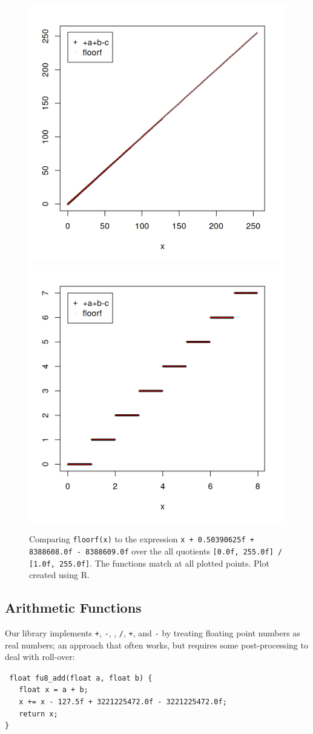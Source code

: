 \documentclass{acmsiggraph}
\theoremstyle{remark}
\theoremstyle{definition}
\begin{document}
\begin{figure}[tb!]
\begin{center}
\includegraphics[width=0.49\columnwidth]{floor256.png}
\includegraphics[width=0.49\columnwidth]{floor8.png}
\end{center}
\caption{\label{fig-floor-graph} Comparing {\tt floorf(x)} to the expression {\tt x + 0.50390625f + 8388608.0f - 8388609.0f} over the all quotients {\tt [0.0f, 255.0f] / [1.0f, 255.0f]}.
The functions match at all plotted points.
{\small Plot created using R.}}
\end{figure}


\subsection{Arithmetic Functions}
Our library implements {\tt +}, {\tt -}, {\tt *}, {\tt /}, {\tt +}, and {\tt -} by treating floating point numbers as real numbers; an approach that often works, but requires some post-processing to deal with roll-over:

{\tt
float fu8\_add(float a, float b) \{ \\
$\phantom{XX}$float x = a + b; \\
$\phantom{XX}$x += x - 127.5f + 3221225472.0f - 3221225472.0f; \\
$\phantom{XX}$return x; \\
\} \\
}
\end{document}
